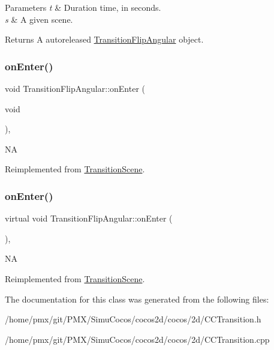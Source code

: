 \begin{DoxyParams}{Parameters}
{\em t} & Duration time, in seconds. \\
\hline
{\em s} & A given scene. \\
\hline
\end{DoxyParams}
\begin{DoxyReturn}{Returns}
A autoreleased \hyperlink{classTransitionFlipAngular}{Transition\+Flip\+Angular} object. 
\end{DoxyReturn}
\mbox{\label{classTransitionFlipAngular_af9318ac2862656fa0853c2457994066f}} 
\subsubsection{\texorpdfstring{on\+Enter()}{onEnter()}\hspace{0.1cm}{\footnotesize\ttfamily [1/2]}}
{\footnotesize\ttfamily void Transition\+Flip\+Angular\+::on\+Enter (\begin{DoxyParamCaption}\item[{void}]{ }\end{DoxyParamCaption})\hspace{0.3cm}{\ttfamily [override]}, {\ttfamily [virtual]}}

NA 

Reimplemented from \hyperlink{classTransitionScene_aace390a1bd8f3c73bb650a1e256a0f83}{Transition\+Scene}.

\mbox{\label{classTransitionFlipAngular_a146fb601d0d9dfabbe0a833f6d08c58b}} 
\subsubsection{\texorpdfstring{on\+Enter()}{onEnter()}\hspace{0.1cm}{\footnotesize\ttfamily [2/2]}}
{\footnotesize\ttfamily virtual void Transition\+Flip\+Angular\+::on\+Enter (\begin{DoxyParamCaption}{ }\end{DoxyParamCaption})\hspace{0.3cm}{\ttfamily [override]}, {\ttfamily [virtual]}}

NA 

Reimplemented from \hyperlink{classTransitionScene_aace390a1bd8f3c73bb650a1e256a0f83}{Transition\+Scene}.



The documentation for this class was generated from the following files\+:\begin{DoxyCompactItemize}
\item 
/home/pmx/git/\+P\+M\+X/\+Simu\+Cocos/cocos2d/cocos/2d/C\+C\+Transition.\+h\item 
/home/pmx/git/\+P\+M\+X/\+Simu\+Cocos/cocos2d/cocos/2d/C\+C\+Transition.\+cpp\end{DoxyCompactItemize}

